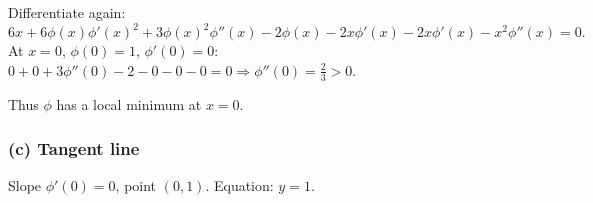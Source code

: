 \documentclass[12pt]{article}
\begin{document}
\begin{answerbox}
Differentiate again:
\[
6x+6\phi(x)\phi'(x)^2+3\phi(x)^2\phi''(x)-2\phi(x)-2x\phi'(x)-2x\phi'(x)-x^2\phi''(x)=0.
\]
At \(x=0\), \(\phi(0)=1\), \(\phi'(0)=0\): \(0+0+3\phi''(0)-2-0-0-0=0 \Rightarrow \phi''(0)=\frac{2}{3}>0\).

Thus \(\phi\) has a local minimum at \(x=0\).

\subsubsection*{(c) Tangent line}
Slope \(\phi'(0)=0\), point \((0,1)\). Equation: \(y=1\).
\end{answerbox}

\end{document}
